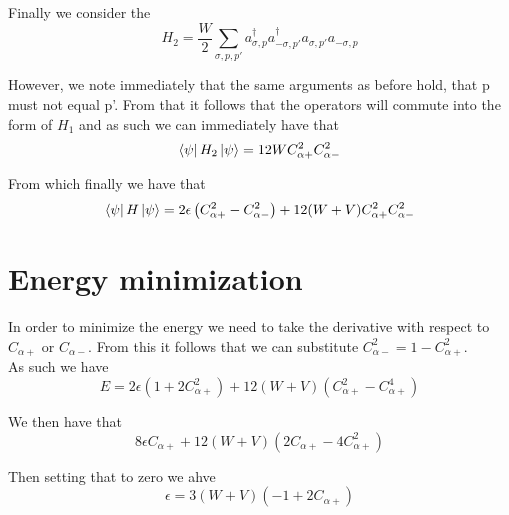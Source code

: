 \documentclass[11pt]{article} %
\begin{document}
Finally we consider the \\
\begin{equation}
H_2 =\frac{W}{2} \sum_{\sigma,p,p'} a_{\sigma,p}^\dagger a_{-\sigma,p'}^\dagger a_{\sigma,p'}a_{-\sigma,p}\end{equation}

However, we note immediately that the same arguments as before hold, that p must not equal p'. From that it follows that the operators will commute into the form of $H_1$ and as such we can immediately have that\\

\begin{equation}
\bra{\psi} H_2 \ket{\psi}=12 W C_{\alpha +}^2 C_{\alpha -}^2 \end{equation}

From which finally we have that\\

\begin{equation}
\bra{\psi}H\ket{\psi}=2\epsilon\left(C_{\alpha+}^2-C_{\alpha-}^2\right)+12(W+V)C_{\alpha+}^2C_{\alpha-}^2 \end{equation}

\section{Energy minimization}

In order to minimize the energy we need to take the derivative with respect to $C_{\alpha+}$ or $C_{\alpha -}$. From this it follows that we can substitute $C_{\alpha-}^2=1-C_{\alpha+}^2$.\\

As such we have \\

\begin{equation}E=2\epsilon\left(1+2C_{\alpha+}^2\right)+12\left(W+V\right)\left(C_{\alpha+}^2-C_{\alpha+}^4\right)\end{equation}

We then have that\\

\begin{equation}
8\epsilon C_{\alpha+}+12\left(W+V\right)\left(2C_{\alpha +}-4C_{\alpha +}^2\right) \end{equation}

Then setting that to zero we ahve\\

\begin{equation}
\epsilon=3\left(W+V\right)\left(-1+2C_{\alpha+}\right)\end{equation}
\end{document}
